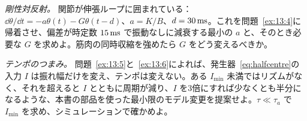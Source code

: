 \begin{exercise}[\lvlB]
\label{ex:13:7}
\emph{剛性対反射。} 関節が伸張ループに囲まれている：$\dd\theta/\dd t=-a\theta(t)-G\theta(t-d)$、$a=K/B$、$d=30\,\text{ms}$。これを問題~\ref{ex:13:4}に帰着させ、偏差が時定数 $15\,\text{ms}$ で振動なしに減衰する最小の $a$ と、そのとき必要な $G$ を求めよ。筋肉の同時収縮を強めたら $G$ をどう変えるべきか。
\end{exercise}

\begin{exercise}[\lvlC]
\label{ex:13:8}
\emph{テンポのつまみ。} 問題~\ref{ex:13:5}と~\ref{ex:13:6}によれば、発生器~\eqref{eq:halfcentre}の入力 $I$ は振れ幅だけを変え、テンポは変えない。ある $I_{\min}$ 未満ではリズムがなく、それを超えると $I$ とともに周期が減り、$I$ を3倍にすれば少なくとも半分になるような、本書の部品を使った最小限のモデル変更を提案せよ。$\tau\ll\tau_a$ で $I_{\min}$ を求め、シミュレーションで確かめよ。
\end{exercise}
